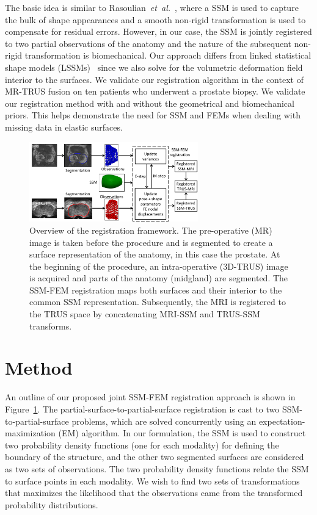 \documentclass[journal]{IEEEtran}
\begin{document}
The basic idea is similar to Rasoulian~\textit{et~al.}~\cite{Rasoulian13a}, where a SSM is used to capture the bulk of shape appearances and a smooth non-rigid transformation is used to compensate for residual errors. However, in our case, the SSM is jointly registered to two partial observations of the anatomy and the nature of the subsequent non-rigid transformation is biomechanical. Our approach differs from linked statistical shape models (LSSMs)~\cite{Chowdhury12a} since we also solve for the volumetric deformation field interior to the surfaces. We validate our registration algorithm in the context of MR-TRUS fusion on ten patients who underwent a prostate biopsy. We validate our registration method with and without the geometrical and biomechanical priors. This helps demonstrate the need for SSM and FEMs when dealing with missing data in elastic surfaces.
\begin{figure}[t]
\center
\includegraphics[width = 0.65\textwidth]{images/workflow.png}
\caption{Overview of the registration framework. The pre-operative (MR) image is taken before the procedure and is segmented to create a surface representation of the anatomy, in this case the prostate. At the beginning of the procedure, an intra-operative (3D-TRUS) image is acquired and parts of the anatomy (midgland) are segmented. The SSM-FEM registration maps both surfaces and their interior to the common SSM representation. Subsequently, the MRI is registered to the TRUS space by concatenating MRI-SSM and TRUS-SSM transforms.}
\label{fig:workflow}
\end{figure}
\section{Method}
An outline of our proposed joint SSM-FEM registration approach is shown in Figure~\ref{fig:workflow}. The partial-surface-to-partial-surface registration is cast to two SSM-to-partial-surface problems, which are solved concurrently using an expectation-maximization (EM) algorithm. In our formulation, the SSM is used to construct two probability density functions (one for each modality) for defining the boundary of the structure, and the other two segmented surfaces are considered as two sets of observations. The two probability density functions relate the SSM to surface points in each modality. We wish to find two sets of transformations that maximizes the likelihood that the observations came from the transformed probability distributions.
\end{document}
